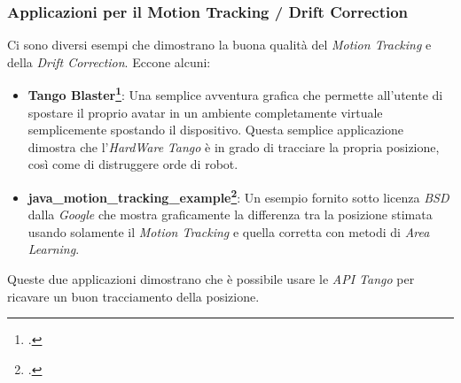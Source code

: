 \subsubsection{Applicazioni per il Motion Tracking / Drift Correction}
Ci sono diversi esempi che dimostrano la buona qualità del \emph{Motion Tracking} e della \emph{Drift Correction}.
Eccone alcuni:
\begin{itemize}
	\item \textbf{Tango Blaster\footcite{site: https://play.google.com/store/apps/details?id=com.projecttango.tangoblaster}}: Una semplice avventura grafica che permette all'utente di spostare il proprio avatar in un ambiente completamente virtuale semplicemente spostando il dispositivo. Questa semplice applicazione dimostra che l'\emph{HardWare} \emph{Tango} è in grado di tracciare la propria posizione, così come di distruggere orde di robot.
	\item \textbf{java\_motion\_tracking\_example\footcite{site: https://github.com/googlesamples/tango-examples-java/tree/master}}: Un esempio fornito sotto licenza \emph{BSD} dalla \emph{Google} che mostra graficamente la differenza tra la posizione stimata usando solamente il \emph{Motion Tracking} e quella corretta con metodi di \emph{Area Learning}.
\end{itemize}
Queste due applicazioni dimostrano che è possibile usare le \emph{API Tango} per ricavare un buon tracciamento della posizione.

